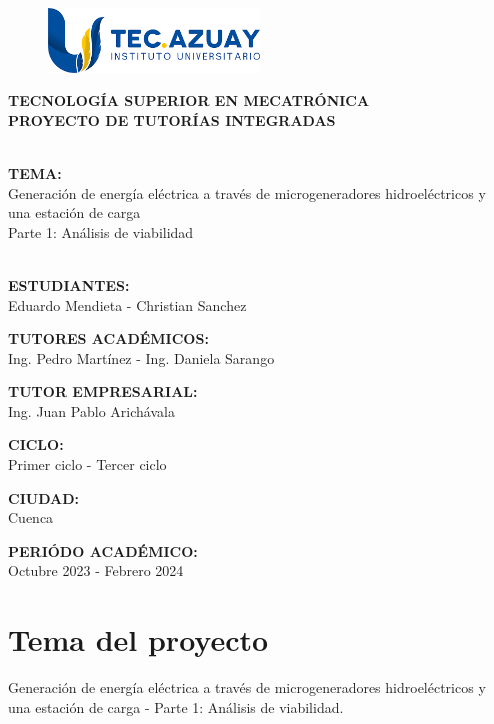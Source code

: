 \documentclass[11pt]{article}
\begin{document}
    \thispagestyle{empty}
    \begin{center}

        \begin{figure}
            \centering         
            \includegraphics[width=0.5\textwidth]{img/logoTecAzuay.png} 
        \end{figure} 

        \textbf{
            TECNOLOGÍA SUPERIOR EN MECATRÓNICA \\ 
            PROYECTO DE TUTORÍAS INTEGRADAS 
        }
        
        \textbf{\\ TEMA: \\} Generación de energía eléctrica a través de microgeneradores hidroeléctricos y una estación de carga \\ Parte 1: Análisis de viabilidad \\\
       
        \textbf{ESTUDIANTES:\\} Eduardo Mendieta - Christian Sanchez 

        \textbf{TUTORES ACADÉMICOS: \\} Ing. Pedro Martínez - Ing. Daniela Sarango

        \textbf{TUTOR EMPRESARIAL: \\} Ing. Juan Pablo Arichávala

        \textbf{CICLO: \\} Primer ciclo - Tercer ciclo

        \textbf{CIUDAD: \\} Cuenca
        
        \textbf{PERIÓDO ACADÉMICO: \\} Octubre 2023 - Febrero 2024

    \end{center}



    \tableofcontents \newpage


    \section{Tema del proyecto}
    Generación de energía eléctrica a través de microgeneradores hidroeléctricos y una
    estación de carga - Parte 1: Análisis de viabilidad.
\end{document}
